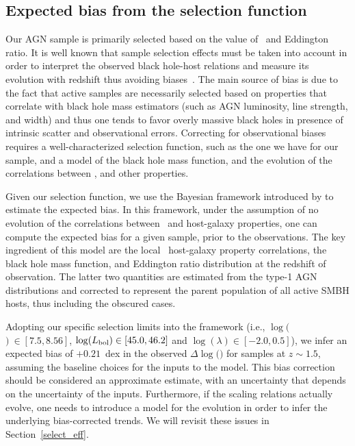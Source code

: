\documentclass[apj]{emulateapj}
\begin{document}
\subsection{Expected bias from the selection function}

\label{sec:sf_framework}

Our AGN sample is primarily selected based on the value of \mbh~and Eddington ratio. It is well known that sample selection effects must be taken into account in order to  interpret the observed black hole-host relations and measure its evolution with redshift thus avoiding biases~\citep{Tre++07,Schulze2011,Bennert++2011, Schulze2014,Park15}. The main source of bias is due to the fact that active samples are necessarily selected based on properties that correlate with black hole mass estimators (such as AGN luminosity, line strength, and width) and thus one tends to favor overly massive black holes in presence of intrinsic scatter and observational errors. Correcting for observational biases requires a well-characterized selection function, such as the one we have for our sample, and a model of the black hole mass function, and the evolution of the correlations between \mbh, and other properties.

Given our selection function, we use the Bayesian framework introduced by \citet{Schulze2011,Schulze2014} to estimate the expected bias. In this framework, under the assumption of no evolution of the correlations between \mbh\ and host-galaxy properties, one can compute the expected bias for a given sample, prior to the observations. The key ingredient of this model are the local \mbh\ host-galaxy property correlations, the black hole mass function, and Eddington ratio distribution at the redshift of observation. The latter two quantities are estimated from the type-1 AGN distributions \citep{Schulze2015} and corrected to represent the parent population of all active SMBH hosts, thus including the obscured cases. 

Adopting our specific selection limits into the framework (i.e., $\log($\mbh$)~\in[7.5, 8.56]$, $\log(L_{\rm bol}) \in [45.0, 46.2] $ and  $\log(\lambda) \in [-2.0, 0.5]$), we infer an expected bias of $+0.21$~dex in the observed $\Delta\log($\mbh$)$ for samples at $z\sim1.5$, assuming the baseline choices for the inputs to the model. This bias correction should be considered an approximate estimate, with an uncertainty that depends on the uncertainty of the inputs. Furthermore, if the scaling relations actually evolve, one needs to introduce a model for the evolution in order to infer the underlying bias-corrected trends. We will revisit these issues in Section~\ref{select_eff}.
\end{document}
